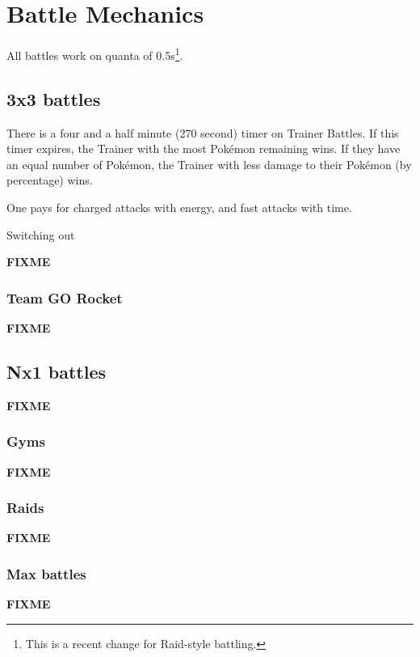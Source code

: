\chapter{Battle Mechanics}
\label{chap:battle}
All battles work on quanta of 0.5s\footnote{This is a recent change for Raid-style battling.}.

\section{3x3 battles}
\label{section:3x3}
There is a four and a half minute (270 second) timer on Trainer Battles.
If this timer expires, the Trainer with the most Pokémon remaining wins.
If they have an equal number of Pokémon, the Trainer with less damage to their
  Pokémon (by percentage) wins.

One pays for charged attacks with energy, and fast attacks with time.

Switching out 

\textbf{FIXME}

\subsection{Team GO Rocket}
\label{section:rocket}
\textbf{FIXME}

\section{Nx1 battles}
\label{section:nx1}
\textbf{FIXME}

\subsection{Gyms}
\label{section:gyms}
\textbf{FIXME}

\subsection{Raids}
\label{section:raids}
\textbf{FIXME}

\subsection{Max battles}
\label{section:maxbattles}
\textbf{FIXME}
